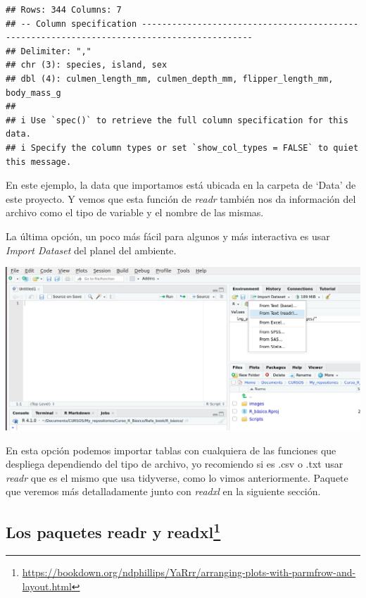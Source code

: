 \documentclass[
]{book}
\begin{document}
\begin{verbatim}
## Rows: 344 Columns: 7
## -- Column specification --------------------------------------------------------------------------------------------
## Delimiter: ","
## chr (3): species, island, sex
## dbl (4): culmen_length_mm, culmen_depth_mm, flipper_length_mm, body_mass_g
## 
## i Use `spec()` to retrieve the full column specification for this data.
## i Specify the column types or set `show_col_types = FALSE` to quiet this message.
\end{verbatim}

\hfill\break

En este ejemplo, la data que importamos está ubicada en la carpeta de `Data' de este proyecto.
Y vemos que esta función de \emph{readr} también nos da información del archivo como el tipo de variable y el nombre de las mismas.

La última opción, un poco más fácil para algunos y más interactiva es usar \emph{Import Dataset} del planel del ambiente.

\begin{center}\includegraphics[width=500pt]{images//import} \end{center}

En esta opción podemos importar tablas con cualquiera de las funciones que despliega dependiendo del tipo de archivo, yo recomiendo si es .csv o .txt usar \emph{readr} que es el mismo que usa tidyverse, como lo vimos anteriormente.
Paquete que veremos más detalladamente junto con \emph{readxl} en la siguiente sección.

\subsection[Los paquetes readr y readxl]{\texorpdfstring{Los paquetes readr y readxl\footnote{\url{https://bookdown.org/ndphillips/YaRrr/arranging-plots-with-parmfrow-and-layout.html}}}{Los paquetes readr y readxl}}\label{los-paquetes-readr-y-readxl1}
\end{document}
